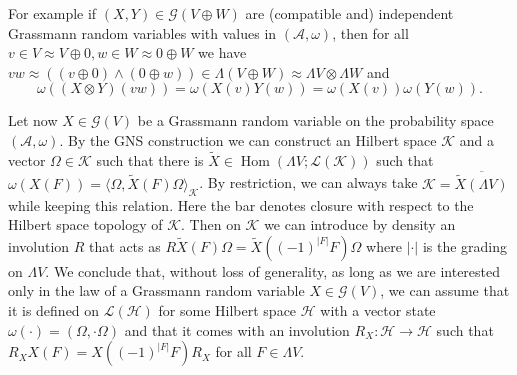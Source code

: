 \documentclass[11pt]{article}
\newcommand{\tmop}[1]{\ensuremath{\operatorname{#1}}}
\begin{document}
For example if $(X, Y) \in \mathcal{G} (V \oplus W)$ are (compatible and)
independent Grassmann random variables with values in $(\mathcal{A}, \omega)$,
then for all $v \in V \approx V \oplus 0, w \in W \approx 0 \oplus W$ we have
$v w \approx ((v \oplus 0) \wedge (0 \oplus w)) \in \Lambda (V \oplus W)
\approx \Lambda V \otimes \Lambda W$ and
\[ \omega ((X \otimes Y) (v w)) = \omega (X (v) Y (w)) = \omega (X (v)) \omega
   (Y (w)) . \]


Let now $X \in \mathcal{G} (V)$ be a Grassmann random variable on the
probability space $(\mathcal{A}, \omega)$. By the GNS construction we can
construct an Hilbert space $\mathcal{K}$ and a vector $\Omega \in \mathcal{K}$
such that there is $\tilde{X} \in \tmop{Hom} (\Lambda V ; \mathcal{L}
(\mathcal{K}))$ such that $\omega (X (F)) = \langle \Omega, \tilde{X} (F)
\Omega \rangle_{\mathcal{K}}$. By restriction, we can always take
$\mathcal{K}= \overline{\tilde{X} (\Lambda V)}$ while keeping this relation.
Here the bar denotes closure with respect to the Hilbert space topology of
$\mathcal{K}$. Then on $\mathcal{K}$ we can introduce by density an involution
$R$ that acts as $R \tilde{X} (F) \Omega = \tilde{X} ((- 1)^{| F |} F) \Omega$
where $| \cdot |$ is the grading on $\Lambda V$. We conclude that, without
loss of generality, as long as we are interested only in the law of a
Grassmann random variable $X \in \mathcal{G} (V)$, we can assume that it is
defined on $\mathcal{L} (\mathcal{H})$ for some Hilbert space $\mathcal{H}$
with a vector state $\omega (\cdot) = (\Omega, \cdot \Omega)$ and that it
comes with an involution $R_X : \mathcal{H} \rightarrow \mathcal{H}$ such that
$R_X X (F) = X ((- 1)^{| F |} F) R_X$ for all $F \in \Lambda V$.

\
\end{document}
